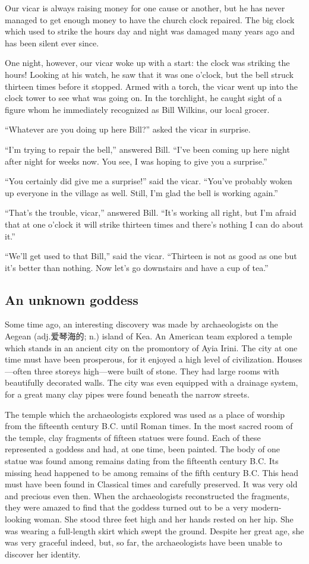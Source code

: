 \documentclass[11pt]{article}
\begin{document}
Our vicar is always raising money for one cause or another, but he has never managed to get enough money to have the church clock repaired. The big clock which used to strike the hours day and night was damaged many years ago and has been silent ever since.

One night, however, our vicar woke up with a start: the clock was striking the hours! Looking at his watch, he saw that it was one o'clock, but the bell struck thirteen times before it stopped. Armed with a torch, the vicar went up into the clock tower to see what was going on. In the torchlight, he caught sight of a figure whom he immediately recognized as Bill Wilkins, our local grocer.

``Whatever are you doing up here Bill?'' asked the vicar in surprise.

``I'm trying to repair the bell,'' answered Bill. ``I've been coming up here night after night for weeks now. You see, I was hoping to give you a surprise.''

``You certainly did give me a surprise!'' said the vicar. ``You've probably woken up everyone in the village as well. Still, I'm glad the bell is working again.''

``That's the trouble, vicar,'' answered Bill. ``It's working all right, but I'm afraid that at one o'clock it will strike thirteen times and there's nothing I can do about it.''

``We'll get used to that Bill,'' said the vicar. ``Thirteen is not as good as one but it's better than nothing. Now let's go downstairs and have a cup of tea.''
\subsection{An unknown goddess}
\label{sec-1-3}

Some time ago, an interesting discovery was made by archaeologists on the Aegean (adj.爱琴海的; n.) island of Kea. An American team explored a temple which stands in an ancient city on the promontory of Ayia Irini. The city at one time must have been prosperous, for it enjoyed a high level of civilization. Houses---often three storeys high---were built of stone. They had large rooms with beautifully decorated walls. The city was even equipped with a drainage system, for a great many clay pipes were found beneath the narrow streets.

The temple which the archaeologists explored was used as a place of worship from the fifteenth century B.C. until Roman times. In the most sacred room of the temple, clay fragments of fifteen statues were found. Each of these represented a goddess and had, at one time, been painted. The body of one statue was found among remains dating from the fifteenth century B.C. Its missing head happened to be among remains of the fifth century B.C. This head must have been found in Classical times and carefully preserved. It was very old and precious even then. When the archaeologists reconstructed the fragments, they were amazed to find that the goddess turned out to be a very modern-looking woman. She stood three feet high and her hands rested on her hip. She was wearing a full-length skirt which swept the ground. Despite her great age, she was very graceful indeed, but, so far, the archaeologists have been unable to discover her identity.
\end{document}
